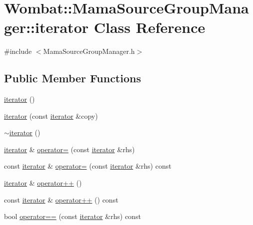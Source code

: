 \hypertarget{classWombat_1_1MamaSourceGroupManager_1_1iterator}{
\section{Wombat::MamaSourceGroupManager::iterator Class Reference}
\label{classWombat_1_1MamaSourceGroupManager_1_1iterator}
}


{\ttfamily \#include $<$MamaSourceGroupManager.h$>$}\subsection*{Public Member Functions}
\begin{DoxyCompactItemize}
\item 
\hyperlink{classWombat_1_1MamaSourceGroupManager_1_1iterator_a65b9dd549b3f87d4ccc0d28c9220efa6}{iterator} ()
\item 
\hyperlink{classWombat_1_1MamaSourceGroupManager_1_1iterator_a26565c939231e84bd17b14dc0001adca}{iterator} (const \hyperlink{classWombat_1_1MamaSourceGroupManager_1_1iterator}{iterator} \&copy)
\item 
\hyperlink{classWombat_1_1MamaSourceGroupManager_1_1iterator_a1fc041ec6b5852301a2a1e2585012ae8}{$\sim$iterator} ()
\item 
\hyperlink{classWombat_1_1MamaSourceGroupManager_1_1iterator}{iterator} \& \hyperlink{classWombat_1_1MamaSourceGroupManager_1_1iterator_a77ae5fb73ee15a5f0814ab36224fcbe2}{operator=} (const \hyperlink{classWombat_1_1MamaSourceGroupManager_1_1iterator}{iterator} \&rhs)
\item 
const \hyperlink{classWombat_1_1MamaSourceGroupManager_1_1iterator}{iterator} \& \hyperlink{classWombat_1_1MamaSourceGroupManager_1_1iterator_acba3ef0bc77f99226c19bf4405e62601}{operator=} (const \hyperlink{classWombat_1_1MamaSourceGroupManager_1_1iterator}{iterator} \&rhs) const 
\item 
\hyperlink{classWombat_1_1MamaSourceGroupManager_1_1iterator}{iterator} \& \hyperlink{classWombat_1_1MamaSourceGroupManager_1_1iterator_ab98446bbffd2ac1e92cf9299af6c94f2}{operator++} ()
\item 
const \hyperlink{classWombat_1_1MamaSourceGroupManager_1_1iterator}{iterator} \& \hyperlink{classWombat_1_1MamaSourceGroupManager_1_1iterator_a57a5e622aff341cea9b58803b45f841a}{operator++} () const 
\item 
bool \hyperlink{classWombat_1_1MamaSourceGroupManager_1_1iterator_ababd23908bc6182308cde11544a71a00}{operator==} (const \hyperlink{classWombat_1_1MamaSourceGroupManager_1_1iterator}{iterator} \&rhs) const 

\end{DoxyCompactItemize}
